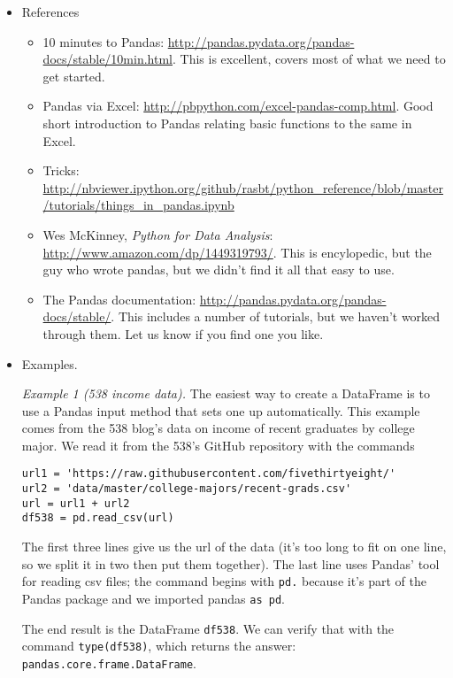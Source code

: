 \documentclass[11pt]{article}
\begin{document}
\begin{itemize}
\item References
\begin{itemize}
\item 10 minutes to Pandas:  \url{http://pandas.pydata.org/pandas-docs/stable/10min.html}.
This is excellent, covers most of what we need to get started.

\item Pandas via Excel:  \url{http://pbpython.com/excel-pandas-comp.html}.
Good short introduction to Pandas relating basic functions to the same in Excel.

\item Tricks:  \url{http://nbviewer.ipython.org/github/rasbt/python_reference/blob/master/tutorials/things_in_pandas.ipynb}

\item Wes McKinney, {\it Python for Data Analysis\/}: \url{http://www.amazon.com/dp/1449319793/}.
This is encylopedic, but the guy who wrote pandas, but we didn't find it all that easy
to use.

\item The Pandas documentation:  \url{http://pandas.pydata.org/pandas-docs/stable/}.
This includes a number of tutorials, but we haven't worked through them.
Let us know if you find one you like.
\end{itemize}

\item Examples.

{\it Example 1 (538 income data).\/}
The easiest way to create a DataFrame is to use a Pandas input method
that sets one up automatically.
This example comes from the 538 blog's data on income of recent graduates by
college major.
We read it from the 538's GitHub repository with the commands
\begin{verbatim}
url1 = 'https://raw.githubusercontent.com/fivethirtyeight/'
url2 = 'data/master/college-majors/recent-grads.csv'
url = url1 + url2
df538 = pd.read_csv(url)
\end{verbatim}
The first three lines give us the url of the data
(it's too long to fit on one line, so we split it in two
then put them together).
The last line uses Pandas' tool for reading csv files;
the command begins with {\tt pd.} because it's part of the Pandas
package and we imported pandas {\tt as pd}.

The end result is the DataFrame {\tt df538}.
We can verify that with the command {\tt type(df538)},
which returns the answer:  {\tt pandas.core.frame.DataFrame}.


\end{itemize}
\end{document}
